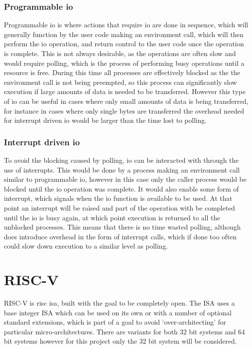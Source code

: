 \subsubsection{Programmable \ac{io}}
Programmable \ac{io} is where actions that require \ac{io} are done in sequence, which will generally function by the user code making an environment call, which will then perform the \ac{io} operation, and return control to the user code once the operation is complete. This is not always desirable, as the operations are often slow and would require polling, which is the process of performing busy operations until a resource is free. During this time all processes are effectively blocked as the the environment call is not being preempted, so this process can significantly slow execution if large amounts of data is needed to be transferred. However this type of \ac{io} can be useful in cases where only small amounts of data is being transferred, for instance in cases where only single bytes are transferred the overhead needed for interrupt driven \ac{io} would be larger than the time lost to polling.
\subsubsection{Interrupt driven \ac{io}}
To avoid the blocking caused by polling, \ac{io} can be interacted with through the use of interrupts. This would be done by a process making an environment call similar to programmable \ac{io}, however in this case only the caller process would be blocked until the \ac{io} operation was complete. It would also enable some form of interrupt, which signals when the \ac{io} function is available to be used. At that point an interrupt will be raised and part of the operation with be completed until the \ac{io} is busy again, at which point execution is returned to all the unblocked processes. This means that there is no time wasted polling, although does introduce overhead in the form of interrupt calls, which if done too often could slow down execution to a similar level as polling.
\section{RISC-V}
RISC-V is \ac{risc} \ac{isa}, built with the goal to be completely open. The ISA uses a base integer ISA which can be used on its own or with a number of optional standard extensions, which is part of a goal to avoid `over-architecting' for particular micro-architectures. There are variants for both 32 bit systems and 64 bit systems however for this project only the 32 bit system will be considered\cite{riscv_unpriv}.
